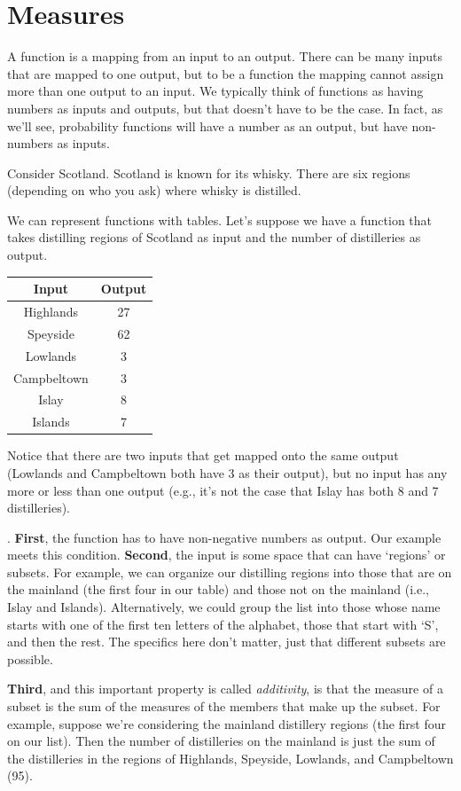 \documentclass[]{tufte-book}
\begin{document}
\hypertarget{measures}{%
\section{Measures}\label{measures}}

A function is a mapping from an input to an output. There can be many inputs that are mapped to one output, but to be a function the mapping cannot assign more than one output to an input. We typically think of functions as having numbers as inputs and outputs, but that doesn't have to be the case. In fact, as we'll see, probability functions will have a number as an output, but have non-numbers as inputs.

Consider Scotland. Scotland is known for its whisky. There are six regions (depending on who you ask) where whisky is distilled.

We can represent functions with tables. Let's suppose we have a function that takes distilling regions of Scotland as input and the number of distilleries as output.

\begin{longtable}[]{@{}cc@{}}
\toprule
Input & Output\tabularnewline
\midrule
\endhead
Highlands & 27\tabularnewline
Speyside & 62\tabularnewline
Lowlands & 3\tabularnewline
Campbeltown & 3\tabularnewline
Islay & 8\tabularnewline
Islands & 7\tabularnewline
\bottomrule
\end{longtable}

Notice that there are two inputs that get mapped onto the same output (Lowlands and Campbeltown both have 3 as their output), but no input has any more or less than one output (e.g., it's not the case that Islay has both 8 and 7 distilleries).

. \textbf{First}, the function has to have non-negative numbers as output. Our example meets this condition. \textbf{Second}, the input is some space that can have `regions' or subsets. For example, we can organize our distilling regions into those that are on the mainland (the first four in our table) and those not on the mainland (i.e., Islay and Islands). Alternatively, we could group the list into those whose name starts with one of the first ten letters of the alphabet, those that start with `S', and then the rest. The specifics here don't matter, just that different subsets are possible.

\textbf{Third}, and this important property is called \emph{additivity}, is that the measure of a subset is the sum of the measures of the members that make up the subset. For example, suppose we're considering the mainland distillery regions (the first four on our list). Then the number of distilleries on the mainland is just the sum of the distilleries in the regions of Highlands, Speyside, Lowlands, and Campbeltown (95).
\end{document}
